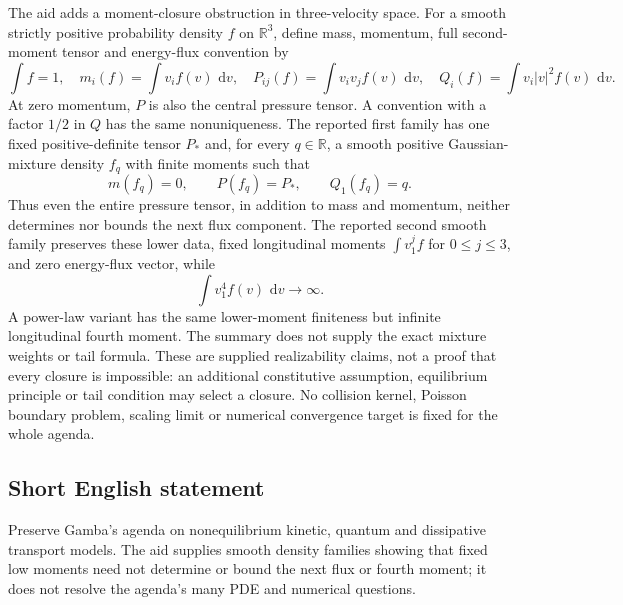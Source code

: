 \documentclass[11pt]{article}
\newcommand{\R}{\mathbb{R}}
\newcommand{\dd}{\,\mathrm{d}}
\begin{document}
The aid adds a moment-closure obstruction in three-velocity space. For a smooth strictly positive probability density $f$ on $\R^3$, define mass, momentum, full second-moment tensor and energy-flux convention by
\[
 \int f=1,\quad m_i(f)=\int v_i f(v)\,\dd v,\quad
 P_{ij}(f)=\int v_iv_j f(v)\,\dd v,\quad
 Q_i(f)=\int v_i|v|^2f(v)\,\dd v.
\]
At zero momentum, $P$ is also the central pressure tensor. A convention with a factor $1/2$ in $Q$ has the same nonuniqueness. The reported first family has one fixed positive-definite tensor $P_*$ and, for every $q\in\R$, a smooth positive Gaussian-mixture density $f_q$ with finite moments such that
\[
 m(f_q)=0,\qquad P(f_q)=P_*,\qquad Q_1(f_q)=q.
\]
Thus even the entire pressure tensor, in addition to mass and momentum, neither determines nor bounds the next flux component. The reported second smooth family preserves these lower data, fixed longitudinal moments $\int v_1^j f$ for $0\le j\le3$, and zero energy-flux vector, while
\[
 \int v_1^4 f(v)\,\dd v\longrightarrow\infty.
\]
A power-law variant has the same lower-moment finiteness but infinite longitudinal fourth moment. The summary does not supply the exact mixture weights or tail formula. These are supplied realizability claims, not a proof that every closure is impossible: an additional constitutive assumption, equilibrium principle or tail condition may select a closure. No collision kernel, Poisson boundary problem, scaling limit or numerical convergence target is fixed for the whole agenda.
\subsection{Short English statement}
Preserve Gamba's agenda on nonequilibrium kinetic, quantum and dissipative transport models. The aid supplies smooth density families showing that fixed low moments need not determine or bound the next flux or fourth moment; it does not resolve the agenda's many PDE and numerical questions.
\end{document}

